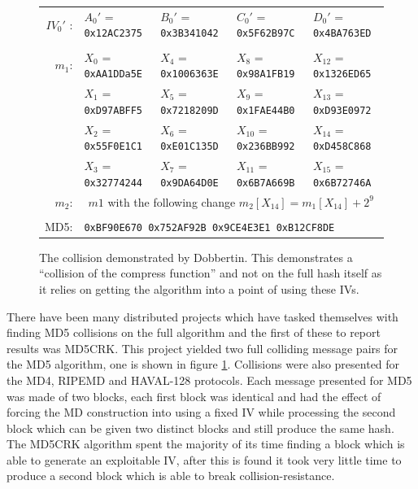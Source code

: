 \documentclass[a4paper,12pt]{article}
\begin{document}
\begin{figure}
\begin{tabular}{|r|  l l l l|}
	$IV_0'$ :& $A_0'$ = \texttt{0x12AC2375}& $B_0'$ = \texttt{0x3B341042}& $C_0'$ = \texttt{0x5F62B97C}& $D_0'$ = \texttt{0x4BA763ED}\\& & & &\\
	$m_1$:& $X_0$ = \texttt{0xAA1DDa5E} & $X_4$ = \texttt{0x1006363E} & $X_8$ = \texttt{0x98A1FB19} & $X_{12}$ = \texttt{0x1326ED65} \\
	& $X_1$ = \texttt{0xD97ABFF5} & $X_5$ = \texttt{0x7218209D} & $X_9$ = \texttt{0x1FAE44B0} & $X_{13}$ = \texttt{0xD93E0972} \\
	& $X_2$ = \texttt{0x55F0E1C1} & $X_6$ = \texttt{0xE01C135D} & $X_{10}$ = \texttt{0x236BB992} & $X_{14}$ = \texttt{0xD458C868} \\
	& $X_3$ = \texttt{0x32774244} & $X_7$ = \texttt{0x9DA64D0E} & $X_{11}$ = \texttt{0x6B7A669B} & $X_{15}$ = \texttt{0x6B72746A} \\
	$m_2$: & \multicolumn{4}{c|}{$m1$ with the following change $m_2[X_{14}] = m_1[X_{14}] + 2^9$ }\\& & & &\\
	MD5: & \multicolumn{4}{l|}{\texttt{0xBF90E670 0x752AF92B 0x9CE4E3E1 0xB12CF8DE}}
\end{tabular}
\caption{The collision demonstrated by Dobbertin\cite{dobbertin}. This demonstrates a ``collision of the compress function'' and not on the full hash itself as it relies on getting the algorithm into a point of using these IVs.}
\label{fig:coldob}

\end{figure}

There have been many distributed projects which have tasked themselves with finding MD5 collisions on the full algorithm and the first of these to report results was MD5CRK\cite{Wang2004}. This project yielded two full colliding message pairs for the MD5 algorithm, one is shown in figure \ref{fig:coldob}. Collisions were also presented for the MD4, RIPEMD and HAVAL-128 protocols. Each message presented for MD5 was made of two blocks, each first block was identical and had the effect of forcing the MD construction into using a fixed IV while processing the second block which can be given two distinct blocks and still produce the same hash. The MD5CRK algorithm spent the majority of its time finding a block which is able to generate an exploitable IV, after this is found it took very little time to produce a second block which is able to break collision-resistance.
\end{document}
